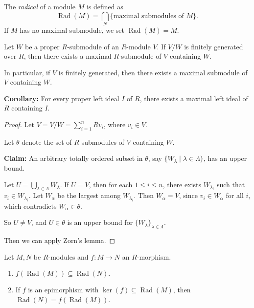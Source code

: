 \documentclass[11pt, a4paper]{report}
\begin{document}
\begin{definition}
The \emph{radical} of a module $M$ is defined as
\[
\operatorname{Rad}(M) = \bigcap_{N} \{ \text{maximal submodules of } M \}.
\]
If $M$ has no maximal submodule, we set $\operatorname{Rad}(M) = M$.
\end{definition}
\begin{lemma}
Let $W$ be a proper $R$-submodule of an $R$-module $V$. If $V/W$ is finitely generated over $R$, then there exists a maximal $R$-submodule of $V$ containing $W$.

In particular, if $V$ is finitely generated, then there exists a maximal submodule of $V$ containing $W$.

\textbf{Corollary:} For every proper left ideal $I$ of $R$, there exists a maximal left ideal of $R$ containing $I$.
\end{lemma}

\begin{proof}
Let $\bar{V}=V/W=\sum_{i=1}^{n} R\overline{v}_{i}$, where $v_{i} \in V$.

Let $\theta$ denote the set of $R$-submodules of $V$ containing $W$.

\textbf{Claim:} An arbitrary totally ordered subset in $\theta$, say $\{W_{\lambda}\mid \lambda \in \Lambda\}$, has an upper bound.

Let $U=\bigcup_{\lambda \in \Lambda} W_{\lambda}$. If $U=V$, then for each $1 \leq i \leq n$, there exists $W_{\lambda_{i}}$ such that $v_{i} \in W_{\lambda_{i}}$. Let $W_{\alpha}$ be the largest among $W_{\lambda_{i}}$. Then $W_{\alpha}=V$, since $v_{i} \in W_{\alpha}$ for all $i$, which contradicts $W_{\alpha} \in \theta$.

So $U \neq V$, and $U \in \theta$ is an upper bound for $\{W_{\lambda}\}_{\lambda \in \Lambda}$.

Then we can apply Zorn's lemma.
\end{proof}

\begin{lemma}
Let $M, N$ be $R$-modules and $f\colon M \to N$ an $R$-morphism.
\begin{enumerate}
\item $f(\operatorname{Rad}(M)) \subseteq \operatorname{Rad}(N)$.
\item If $f$ is an epimorphism with $\ker(f) \subseteq \operatorname{Rad}(M)$, then $\operatorname{Rad}(N)=f(\operatorname{Rad}(M))$.
\end{enumerate}
\end{lemma}
\end{document}
